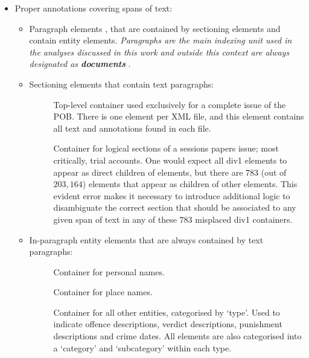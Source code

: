 \begin{itemize}
    \item Proper annotations covering spans of text:
    \begin{itemize}
        \item Paragraph elements , that are contained by sectioning elements and contain entity elements.
        \emph{
            Paragraphs are the main indexing unit used in the analyses discussed in this work and outside this context are always designated as \textbf{documents}
        }.

        \item Sectioning elements that contain text paragraphs:
        \begin{description}
            \item []
            Top-level container used exclusively for a complete issue of the POB.
            There is one  element per XML file, and this element contains all text and annotations found in each file.
            \item []
            Container for logical sections of a sessions papers issue; most critically, trial accounts.
            One would expect all div1 elements to appear as direct children of  elements, but there are $783$ (out of $203,164$)  elements that appear as children of other  elements.
            This evident error makes it necessary to introduce additional logic to disambiguate the correct section that should be associated to any given span of text in any of these $783$ misplaced div1 containers.
        \end{description}

        \item In-paragraph entity elements that are always contained by text paragraphs:
        \begin{description}
            \item []
            Container for personal names.
            \item []
            Container for place names.
            \item []
            Container for all other entities, categorised by `type'.
            Used to indicate offence descriptions, verdict descriptions, punishment descriptions and crime dates.
            All  elements are also categorised into a `category' and `subcategory' within each type.
        \end{description}


\end{itemize}
\end{itemize}
